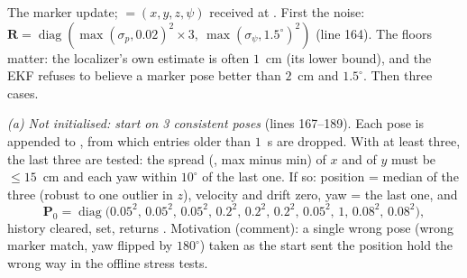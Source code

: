 The marker update;  $=(x,y,z,\psi)$ received at . First the noise:
$\mathbf R = \operatorname{diag}(\max(\sigma_p,0.02)^2\times3,\ \max(\sigma_\psi,1.5^\circ)^2)$ (line 164). The floors
matter: the localizer's own estimate is often $1$~cm (its lower bound), and the EKF refuses to believe a marker pose better
than $2$~cm and $1.5^\circ$. Then three cases.

\emph{(a) Not initialised: start on 3 consistent poses} (lines 167--189). Each pose is appended to , from
which entries older than $1$~s are dropped. With at least three, the last three are tested: the spread
(, max minus min) of $x$ and of $y$ must be $\le 15$~cm and each yaw within $10^\circ$ of the last one. If so:
position = median of the three (robust to one outlier in $z$), velocity and drift zero, yaw = the last one, and
\begin{equation}
\mathbf P_0 = \operatorname{diag}\big(0.05^2,\,0.05^2,\,0.05^2,\,0.2^2,\,0.2^2,\,0.2^2,\,0.05^2,\,1,\,0.08^2,\,0.08^2\big),
\end{equation}
history cleared,  set, returns . Motivation (comment): a single wrong pose (wrong marker match,
yaw flipped by $180^\circ$) taken as the start sent the position hold the wrong way in the offline stress tests.

